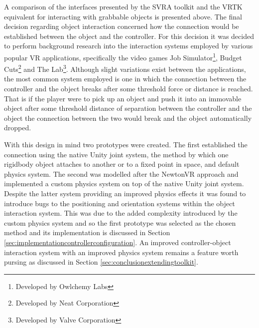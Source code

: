 \documentclass{l4proj}
\begin{document}
A comparison of the interfaces presented by the SVRA toolkit and the VRTK equivalent for interacting with grabbable objects is presented above. The final decision regarding object interaction concerned how the connection would be established between the object and the controller. For this decision it was decided to perform background research into the interaction systems employed by various popular VR applications, specifically the video games Job Simulator\footnote{Developed by Owlchemy Labs}, Budget Cuts\footnote{Developed by Neat Corporation} and The Lab\footnote{Developed by Valve Corporation}. Although slight variations exist between the applications, the most common system employed is one in which the connection between the controller and the object breaks after some threshold force or distance is reached. That is if the player were to pick up an object and push it into an immovable object after some threshold distance of separation between the controller and the object the connection between the two would break and the object automatically dropped. 

With this design in mind two prototypes were created. The first established the connection using the native Unity joint system, the method by which one rigidbody object attaches to another or to a fixed point in space, and default physics system. The second was modelled after the NewtonVR approach and implemented a custom physics system on top of the native Unity joint system. Despite the latter system providing an improved physics effects it was found to introduce bugs to the positioning and orientation systems within the object interaction system. This was due to the added complexity introduced by the custom physics system and so the first prototype was selected as the chosen method and its implementation is discussed in Section \ref{sec:implementationcontrollerconfiguration}. An improved controller-object interaction system with an improved physics system remains a feature worth pursing as discussed in Section \ref{sec:conclusionextendingtoolkit}. 
\end{document}
